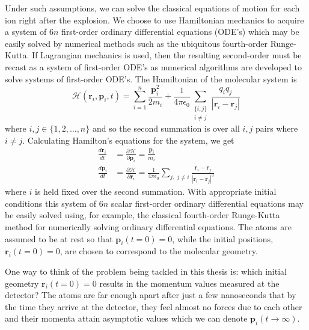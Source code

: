 Under such assumptions, we can solve the classical equations of motion for each ion right after the explosion. We choose to use Hamiltonian mechanics to acquire a system of $6n$ first-order ordinary differential equations (ODE's) which may be easily solved by numerical methods such as the ubiquitous fourth-order Runge-Kutta. If Lagrangian mechanics is used, then the resulting second-order must be recast as a system of first-order ODE's as numerical algorithms are developed to solve systems of first-order ODE's. The Hamiltonian of the molecular system is
\begin{equation}
\mathcal{H}(\mathbf{r}_i, \mathbf{p}_i, t) = \sum_{i=1}^n \frac{\mathbf{p}_i^2}{2m_i} + \frac{1}{4\pi\epsilon_0}\sum_{\substack{\lbrace i,j\rbrace\\ i \ne j}} \frac{q_iq_j}{|\mathbf{r}_i-\mathbf{r}_j|}
\end{equation}
where $i,j \in \lbrace 1,2,\dots, n \rbrace$ and so the second summation is over all $i,j$ pairs where $i \ne j$. Calculating Hamilton's equations for the system, we get
\begin{subequations}
  \begin{align}
  \frac{d\mathbf{r}_i}{dt} &= \frac{\partial \mathcal{H}}{\partial \mathbf{p}_i} = \frac{\mathbf{p}_i}{m_i} \\
  \frac{d\mathbf{p}_i}{dt} &= \frac{\partial \mathcal{H}}{\partial \mathbf{r}_i} = \frac{1}{4\pi\epsilon_0}\sum_{j, \; j \ne i} \frac{\mathbf{r}_i - \mathbf{r}_j}{|\mathbf{r}_i - \mathbf{r}_j|^3}
  \end{align}
\end{subequations}
where $i$ is held fixed over the second summation. With appropriate initial conditions this system of $6n$ scalar first-order ordinary differential equations may be easily solved using, for example, the classical fourth-order Runge-Kutta method for numerically solving ordinary differential equations. The atoms are assumed to be at rest so that $\mathbf{p}_i(t=0) = 0$, while the initial positions, $\mathbf{r}_i(t=0) = 0$, are chosen to correspond to the molecular geometry.

One way to think of the problem being tackled in this thesis is: which initial geometry $\mathbf{r}_i(t=0) = 0$ results in the momentum values measured at the detector? The atoms are far enough apart after just a few nanoseconds that by the time they arrive at the detector, they feel almost no forces due to each other and their momenta attain asymptotic values which we can denote $\mathbf{p}_i(t\rightarrow\infty)$.

